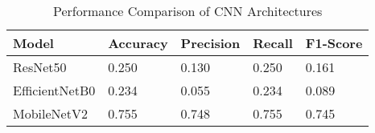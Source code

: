 \documentclass{article}
\begin{document}
\begin{table}[h]
\centering
\caption{Performance Comparison of CNN Architectures}
\label{tab:model_comparison}
\begin{tabular}{lllll}
\toprule
Model & Accuracy & Precision & Recall & F1-Score \\
\midrule
ResNet50 & 0.250 & 0.130 & 0.250 & 0.161 \\
EfficientNetB0 & 0.234 & 0.055 & 0.234 & 0.089 \\
MobileNetV2 & 0.755 & 0.748 & 0.755 & 0.745 \\
\bottomrule
\end{tabular}
\end{table}
\end{document}
